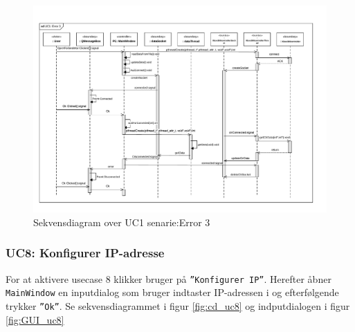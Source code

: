 \begin{landscape}
\begin{figure}
\centering
\includegraphics[width=\linewidth]{../fig/diagrammer/pc/sd_uc1_Error_3.pdf}
\caption{Sekvensdiagram over UC1 senarie:Error 3}
\label{fig:cd_uc1_error_3}
\end{figure}
\vfill
\end{landscape}

\clearpage

\subsubsection{UC8: Konfigurer IP-adresse}
For at aktivere usecase 8 klikker bruger på \texttt{''Konfigurer IP''}. Herefter åbner \texttt{MainWindow} en inputdialog som bruger indtaster IP-adressen i og efterfølgende trykker \texttt{''Ok''}. Se sekvensdiagrammet i figur \ref{fig:cd_uc8} og indputdialogen i figur \ref{fig:GUI_uc8} 

